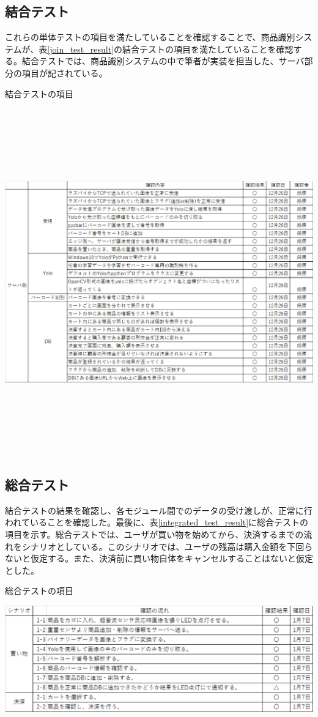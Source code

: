 \newpage

\subsection{結合テスト}

これらの単体テストの項目を満たしていることを確認することで、商品識別システムが、表\ref{join_test_result}の結合テストの項目を満たしていることを確認する。結合テストでは、商品識別システムの中で筆者が実装を担当した、サーバ部分の項目が記されている。

\begin{table}[htbp]
\centering
\caption{結合テストの項目}
\includegraphics[height=15cm,width=15cm]{./pic/result/join_test_result.eps}
\label{join_test_result}
\end{table}

\newpage

\subsection{総合テスト}

結合テストの結果を確認し、各モジュール間でのデータの受け渡しが、正常に行われていることを確認した。最後に、表\ref{integrated_test_result}に総合テストの項目を示す。総合テストでは、ユーザが買い物を始めてから、決済するまでの流れをシナリオとしている。このシナリオでは、ユーザの残高は購入金額を下回らないと仮定する。また、決済前に買い物自体をキャンセルすることはないと仮定とした。

\begin{table}[htbp]
\centering
\caption{総合テストの項目}
\includegraphics[width=15cm]{./pic/result/integrated_test_result.eps}
\label{integrated_test_result}
\end{table}